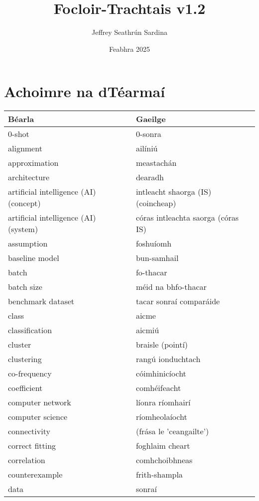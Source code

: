 \documentclass{article}
\title{Focloir-Trachtais v1.2}
\author{Jeffrey Seathrún Sardina}
\date{Feabhra 2025}
\begin{document}
            \maketitle

            \newpage
            \tableofcontents
        
\newpage \section{Achoimre na dTéarmaí}\begin{longtable}{|l|l|}
	\hline
		\textbf{Béarla} & \textbf{Gaeilge}\\ \hline 
		0-shot&0-sonra\\ \hline 
		alignment&ailíniú\\ \hline 
		approximation&meastachán\\ \hline 
		architecture&dearadh\\ \hline 
		artificial intelligence (AI) (concept)&intleacht shaorga (IS) (coincheap)\\ \hline 
		artificial intelligence (AI) (system)&córas intleachta saorga (córas IS)\\ \hline 
		assumption&foshuíomh\\ \hline 
		baseline model&bun-samhail\\ \hline 
		batch&fo-thacar\\ \hline 
		batch size&méid na bhfo-thacar\\ \hline 
		benchmark dataset&tacar sonraí comparáide\\ \hline 
		class&aicme\\ \hline 
		classification&aicmiú\\ \hline 
		cluster&braisle (pointí)\\ \hline 
		clustering&rangú ionduchtach\\ \hline 
		co-frequency&cóimhinicíocht\\ \hline 
		coefficient&comhéifeacht\\ \hline 
		computer network&líonra ríomhairí\\ \hline 
		computer science&ríomheolaíocht\\ \hline 
		connectivity&(frása le 'ceangailte')\\ \hline 
		correct fitting&foghlaim cheart\\ \hline 
		correlation&comhchoibhneas\\ \hline 
		counterexample&frith-shampla\\ \hline 
		data&sonraí\\ \hline 

\end{longtable}
\end{document}
